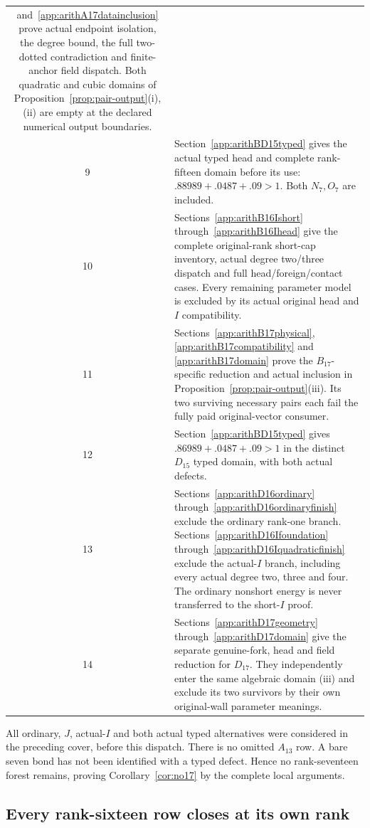 \documentclass[11pt]{article}
\begin{document}
\begin{longtable}{cp{10.3cm}}
and~\ref{app:arithA17datainclusion}
prove actual endpoint isolation,
the degree bound, the full two-dotted
contradiction and finite-anchor
field dispatch. Both quadratic and
cubic domains of
Proposition~\ref{prop:pair-output}(i),(ii)
are empty at the declared numerical
output boundaries.\\
9&Section~\ref{app:arithBD15typed}
gives the actual typed head and
complete rank-fifteen domain before
its use: \(.88989+.0487+.09>1\).
Both \(N_7,O_7\) are included.\\
10&Sections~\ref{app:arithB16Ishort}
through~\ref{app:arithB16Ihead}
give the complete original-rank
short-cap inventory, actual degree
two/three dispatch and full
head/foreign/contact cases.
Every remaining parameter model
is excluded by its actual original
head and \(I\) compatibility.\\
11&Sections~\ref{app:arithB17physical},
\ref{app:arithB17compatibility} and
\ref{app:arithB17domain} prove the
\(B_{17}\)-specific reduction and
actual inclusion in
Proposition~\ref{prop:pair-output}(iii).
Its two surviving necessary pairs
each fail the fully paid
original-vector consumer.\\
12&Section~\ref{app:arithBD15typed}
gives \(.86989+.0487+.09>1\)
in the distinct \(D_{15}\) typed
domain, with both actual defects.\\
13&Sections~\ref{app:arithD16ordinary}
through~\ref{app:arithD16ordinaryfinish}
exclude the ordinary rank-one branch.
Sections~\ref{app:arithD16Ifoundation}
through~\ref{app:arithD16Iquadraticfinish}
exclude the actual-\(I\) branch,
including every actual degree
two, three and four. The ordinary
nonshort energy is never transferred
to the short-\(I\) proof.\\
14&Sections~\ref{app:arithD17geometry}
through~\ref{app:arithD17domain}
give the separate genuine-fork,
head and field reduction for \(D_{17}\).
They independently enter the same
algebraic domain (iii) and exclude
its two survivors by their own
original-wall parameter meanings.\\
\bottomrule
\end{longtable}

All ordinary, \(J\), actual-\(I\)
and both actual typed alternatives
were considered in the preceding
cover, before this dispatch.
There is no omitted \(A_{13}\) row.
A bare seven bond has not been
identified with a typed defect.
Hence no rank-seventeen forest
remains, proving
Corollary~\ref{cor:no17} by the
complete local arguments.

\subsection{Every rank-sixteen row closes at its own rank}
\label{app:arithranksixteenclosure}
\end{document}

